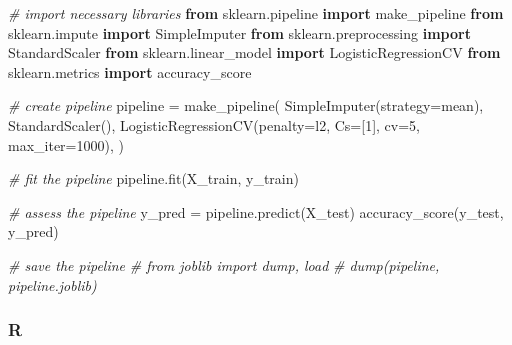 \documentclass[
  letterpaper,
]{krantz}
\newenvironment{Shaded}{}{}
\newcommand{\CommentTok}[1]{\textcolor[rgb]{0.38,0.63,0.69}{\textit{#1}}}
\newcommand{\DecValTok}[1]{\textcolor[rgb]{0.25,0.63,0.44}{#1}}
\newcommand{\ImportTok}[1]{\textcolor[rgb]{0.00,0.50,0.00}{\textbf{#1}}}
\newcommand{\NormalTok}[1]{#1}
\newcommand{\OperatorTok}[1]{\textcolor[rgb]{0.40,0.40,0.40}{#1}}
\newcommand{\StringTok}[1]{\textcolor[rgb]{0.25,0.44,0.63}{#1}}
\begin{document}
\begin{Shaded}
\begin{Highlighting}[]
\CommentTok{\# import necessary libraries}
\ImportTok{from}\NormalTok{ sklearn.pipeline }\ImportTok{import}\NormalTok{ make\_pipeline}
\ImportTok{from}\NormalTok{ sklearn.impute }\ImportTok{import}\NormalTok{ SimpleImputer}
\ImportTok{from}\NormalTok{ sklearn.preprocessing }\ImportTok{import}\NormalTok{ StandardScaler}
\ImportTok{from}\NormalTok{ sklearn.linear\_model }\ImportTok{import}\NormalTok{ LogisticRegressionCV}
\ImportTok{from}\NormalTok{ sklearn.metrics }\ImportTok{import}\NormalTok{ accuracy\_score}

\CommentTok{\# create pipeline}
\NormalTok{pipeline }\OperatorTok{=}\NormalTok{ make\_pipeline(}
\NormalTok{    SimpleImputer(strategy}\OperatorTok{=}\StringTok{\textquotesingle{}mean\textquotesingle{}}\NormalTok{),}
\NormalTok{    StandardScaler(),}
\NormalTok{    LogisticRegressionCV(penalty}\OperatorTok{=}\StringTok{\textquotesingle{}l2\textquotesingle{}}\NormalTok{, Cs}\OperatorTok{=}\NormalTok{[}\DecValTok{1}\NormalTok{], cv}\OperatorTok{=}\DecValTok{5}\NormalTok{, max\_iter}\OperatorTok{=}\DecValTok{1000}\NormalTok{),}
\NormalTok{)}

\CommentTok{\# fit the pipeline}
\NormalTok{pipeline.fit(X\_train, y\_train)}

\CommentTok{\# assess the pipeline}
\NormalTok{y\_pred }\OperatorTok{=}\NormalTok{ pipeline.predict(X\_test)}
\NormalTok{accuracy\_score(y\_test, y\_pred)}

\CommentTok{\# save the pipeline}
\CommentTok{\# from joblib import dump, load}
\CommentTok{\# dump(pipeline, \textquotesingle{}pipeline.joblib\textquotesingle{})}
\end{Highlighting}
\end{Shaded}

\subsubsection{R}
\end{document}

